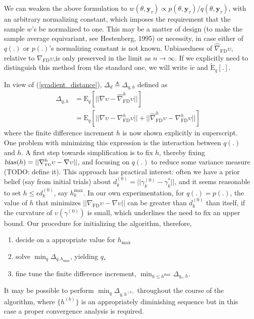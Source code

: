 \documentclass{article}
\begin{document}
We can weaken the above formulation to
$w(\theta,\mathbf{y}_{\tau})\propto
p(\theta,\mathbf{y}_{\tau})/q(\theta,\mathbf{y}_{\tau})$, with an
arbitrary normalizing constant, which imposes the requirement that
the sample $w$'s be normalized to one. This may be a matter of
design (to make the sample average equivariant, see Hestenberg,
1995) or necessity, in case either of $q(.)$ or $p(.)$'s normalizing
constant is not known. Unbiasedness of
$\widehat{\nabla}_{\mathrm{\scriptscriptstyle FD}} \upsilon$,
relative to $\nabla_{\mathrm{\scriptscriptstyle FD}} \upsilon$,is
only preserved in the limit as $n\rightarrow \infty$. If we
explicitly need to distinguish this method from the standard one, we
will write $\tilde w$ and $\widetilde{\mathrm{E}}_q[.]$.


In view of (\ref{gradient_distance}), $\Delta_d \triangleq
\Delta_{q,h}$ defined as
\begin{align}
\Delta_{q,h} &=\mathrm{E}_q[||\nabla\upsilon-\widehat\nabla
_{\mathrm{\scriptscriptstyle FD}}^h\upsilon||]\\
&=\mathrm{E}_q[||\nabla\upsilon-\nabla _{\mathrm{\scriptscriptstyle
FD}}^h\upsilon||+||\widehat\nabla _{\mathrm{\scriptscriptstyle
FD}}^h\upsilon-\nabla _{\mathrm{\scriptscriptstyle FD}}^h\upsilon||]
\end{align}where the finite difference increment $h$ is now shown
explicitly in superscript. One problem with minimizing this
expression is the interaction between $q(.)$ and $h$. A first step
towards simplification is to fix $h$, thereby fixing
$\textsl{bias}_{}(h)=||\nabla_\mathrm{\scriptscriptstyle
FD}^h\upsilon-\nabla\upsilon||$, and focusing on $q(.)$ to reduce
some variance measure (TODO: define it). This approach has practical
interest: often we have a prior belief (say from initial trials)
about $d_k^{(0)}=||\gamma_k^{(0)}-\gamma_{k}^*||$, and it seems
reasonable to set $h\leq \epsilon d_k^{(0)}$, say $h_k^{\max}$. In
our own experimentation, for $q(.)=p(.)$, the value of $h$ that
minimizes $||\nabla_\mathrm{\scriptscriptstyle
FD}\upsilon-\nabla\upsilon||$ can be greater than $d_k^{(0)}$ than
itself, if the curvature of $\upsilon(\gamma^{(0)})$ is small, which
underlines the need to fix an upper bound. Our procedure for
initializing the algorithm, therefore, \begin{enumerate}\item decide
on a appropriate value for $h_{\max}$ \item solve $\min_q
\Delta_{q,h_{\max}}$, yielding $q_*$ \item fine tune the finite
difference increment, $\min_{h\leq
h^{\max}}\Delta_{q_*,h}$.\end{enumerate} It may be possible to
perform $\min_q \Delta_{q,h^{(b)}}$ throughout the course of the
algorithm, where $\{h^{(b)}\}$ is an appropriately diminishing
sequence but in this case a proper convergence analysis is required.
\end{document}
